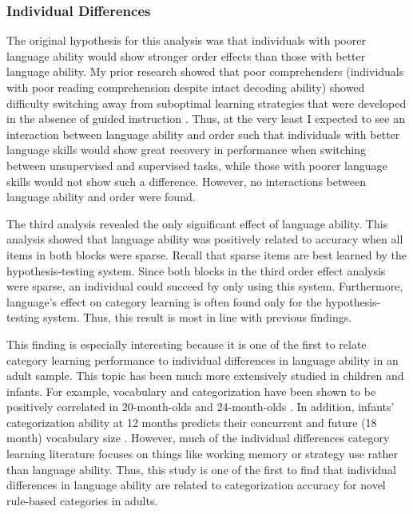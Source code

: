 \documentclass[../dissertation.tex]{subfiles}
\begin{document}
\subsubsection{Individual Differences}

	The original hypothesis for this analysis was that individuals with poorer language ability would show stronger order effects than those with better language ability. My prior research showed that poor comprehenders (individuals with poor reading comprehension despite intact decoding ability) showed difficulty switching away from suboptimal learning strategies that were developed in the absence of guided instruction \citep{Ryherd2019}. Thus, at the very least I expected to see an interaction between language ability and order such that individuals with better language skills would show great recovery in performance when switching between unsupervised and supervised tasks, while those with poorer language skills would not show such a difference. However, no interactions between language ability and order were found. \par
	The third analysis revealed the only significant effect of language ability. This analysis showed that language ability was positively related to accuracy when all items in both blocks were sparse. Recall that sparse items are best learned by the hypothesis-testing system. Since both blocks in the third order effect analysis were sparse, an individual could succeed by only using this system. Furthermore, language's effect on category learning is often found only for the hypothesis-testing system. Thus, this result is most in line with previous findings. \par 
	This finding is especially interesting because it is one of the first to relate category learning performance to individual differences in language ability in an adult sample. This topic has been much more extensively studied in children and infants. For example, vocabulary and  categorization have been shown to be positively correlated in 20-month-olds \citep{Nazzi2001} and 24-month-olds \citep{Jaswal2007}. In addition, infants' categorization ability at 12 months predicts their concurrent and future (18 month) vocabulary size \citep{Ferguson2015}. However, much of the individual differences category learning literature focuses on things like working memory or strategy use rather than language ability. Thus, this study is one of the first to find that individual differences in language ability are related to categorization accuracy for novel rule-based categories in adults.
	
\end{document}
